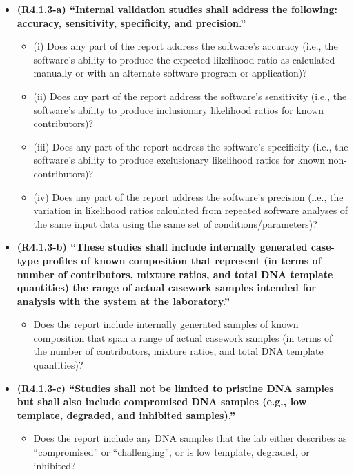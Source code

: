 \begin{itemize}
    
    \item \textbf{(R4.1.3-a) ``Internal validation studies shall address the following: accuracy, sensitivity, specificity, and precision.''}~\cite[p.~3]{asb018}   
    \begin{itemize}
        \item (i) Does any part of the report address the software's accuracy (i.e., the software's ability to produce the expected likelihood ratio as calculated manually or with an alternate software program or application)?
        \item (ii) Does any part of the report address the software's sensitivity (i.e., the software's ability to produce inclusionary likelihood ratios for known contributors)?
        \item (iii) Does any part of the report address the software's specificity (i.e., the software's ability to produce exclusionary likelihood ratios for known non-contributors)?
        \item (iv) Does any part of the report address the software's precision (i.e., the variation in likelihood ratios calculated from repeated software analyses of the same input data using the same set of conditions/parameters)?
    \end{itemize}
    
    \item \textbf{(R4.1.3-b) ``These studies shall include internally generated case-type profiles of known composition that represent (in terms of number of contributors, mixture ratios, and total DNA template quantities) the range of actual casework samples intended for analysis with the system at the laboratory.''}~\cite[p.~3]{asb018}
    \begin{itemize}
        \item Does the report include internally generated samples of known composition that span a range of actual casework samples (in terms of the number of contributors, mixture ratios, and total DNA template quantities)?
    \end{itemize}

     \item \textbf{(R4.1.3-c) ``Studies shall not be limited to pristine DNA samples but shall also include compromised DNA samples (e.g., low template, degraded, and inhibited samples).''}~\cite[p.~3]{asb018}
    \begin{itemize}
        \item Does the report include any DNA samples that the lab either describes as ``compromised'' or ``challenging'', or is low template, degraded, or inhibited?
    \end{itemize}


\end{itemize}
